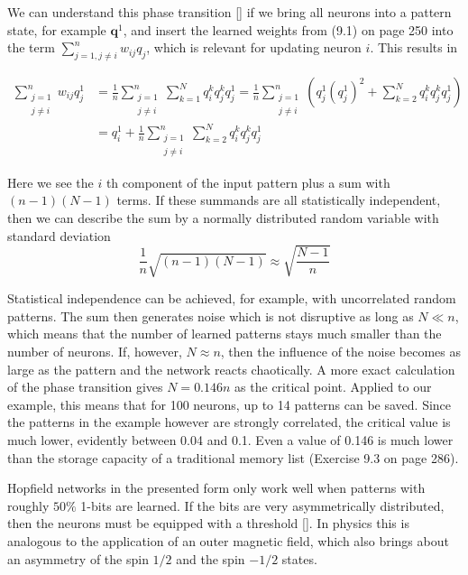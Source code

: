 \documentclass[10pt]{book}
\begin{document}
We can understand this phase transition [\cite{ritter1992som}] if we bring all neurons into a pattern state, for example $\boldsymbol{q}^{1}$, and insert the learned weights from (9.1) on page 250 into the term $\sum_{j=1, j \neq i}^{n} w_{i j} q_{j}$, which is relevant for updating neuron $i$. This results in

$$
\begin{aligned}
\sum_{\substack{j=1 \\
j \neq i}}^{n} w_{i j} q_{j}^{1} & =\frac{1}{n} \sum_{\substack{j=1 \\
j \neq i}}^{n} \sum_{k=1}^{N} q_{i}^{k} q_{j}^{k} q_{j}^{1}=\frac{1}{n} \sum_{\substack{j=1 \\
j \neq i}}^{n}\left(q_{j}^{1}\left(q_{j}^{1}\right)^{2}+\sum_{k=2}^{N} q_{i}^{k} q_{j}^{k} q_{j}^{1}\right) \\
& =q_{i}^{1}+\frac{1}{n} \sum_{\substack{j=1 \\
j \neq i}}^{n} \sum_{k=2}^{N} q_{i}^{k} q_{j}^{k} q_{j}^{1}
\end{aligned}
$$

Here we see the $i$ th component of the input pattern plus a sum with $(n-1)(N-1)$ terms. If these summands are all statistically independent, then we can describe the sum by a normally distributed random variable with standard deviation
\[
\frac{1}{n} \sqrt{(n-1)(N-1)} \approx \sqrt{\frac{N-1}{n}}
\]

Statistical independence can be achieved, for example, with uncorrelated random patterns. The sum then generates noise which is not disruptive as long as $N \ll n$, which means that the number of learned patterns stays much smaller than the number of neurons. If, however, $N \approx n$, then the influence of the noise becomes as large as the pattern and the network reacts chaotically. A more exact calculation of the phase transition gives $N=0.146 n$ as the critical point. Applied to our example, this means that for 100 neurons, up to 14 patterns can be saved. Since the patterns in the example however are strongly correlated, the critical value is much lower, evidently between 0.04 and 0.1. Even a value of 0.146 is much lower than the storage capacity of a traditional memory list (Exercise 9.3 on page 286).

Hopfield networks in the presented form only work well when patterns with roughly $50 \%$ 1-bits are learned. If the bits are very asymmetrically distributed, then the neurons must be equipped with a threshold [\cite{rojas1996neural}]. In physics this is analogous to the application of an outer magnetic field, which also brings about an asymmetry of the spin $1 / 2$ and the spin $-1 / 2$ states.
\end{document}
